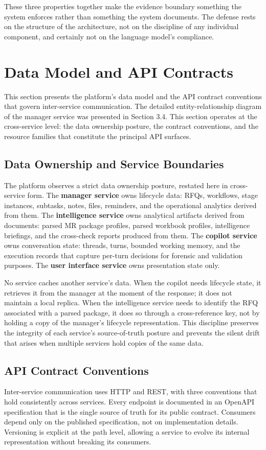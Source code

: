 These three properties together make the evidence boundary something the system enforces rather than something the system documents. The defense rests on the structure of the architecture, not on the discipline of any individual component, and certainly not on the language model's compliance.

\section{Data Model and API Contracts}
This section presents the platform's data model and the API contract conventions that govern inter-service communication. The detailed entity-relationship diagram of the manager service was presented in Section 3.4. This section operates at the cross-service level: the data ownership posture, the contract conventions, and the resource families that constitute the principal API surfaces.

\subsection*{Data Ownership and Service Boundaries}
The platform observes a strict data ownership posture, restated here in cross-service form. The \textbf{manager service} owns lifecycle data: RFQs, workflows, stage instances, subtasks, notes, files, reminders, and the operational analytics derived from them. The \textbf{intelligence service} owns analytical artifacts derived from documents: parsed MR package profiles, parsed workbook profiles, intelligence briefings, and the cross-check reports produced from them. The \textbf{copilot service} owns conversation state: threads, turns, bounded working memory, and the execution records that capture per-turn decisions for forensic and validation purposes. The \textbf{user interface service} owns presentation state only.

No service caches another service's data. When the copilot needs lifecycle state, it retrieves it from the manager at the moment of the response; it does not maintain a local replica. When the intelligence service needs to identify the RFQ associated with a parsed package, it does so through a cross-reference key, not by holding a copy of the manager's lifecycle representation. This discipline preserves the integrity of each service's source-of-truth posture and prevents the silent drift that arises when multiple services hold copies of the same data.

\subsection*{API Contract Conventions}
Inter-service communication uses HTTP and REST, with three conventions that hold consistently across services. Every endpoint is documented in an OpenAPI specification that is the single source of truth for its public contract. Consumers depend only on the published specification, not on implementation details. Versioning is explicit at the path level, allowing a service to evolve its internal representation without breaking its consumers.

